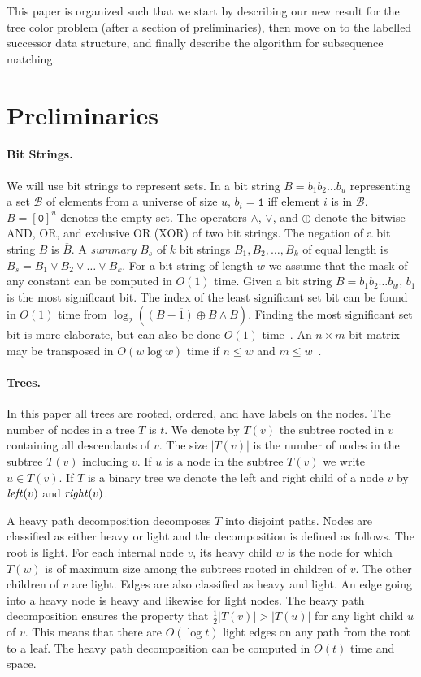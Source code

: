 \documentclass[11pt]{article}
\newcommand{\tree}{\ensuremath{T}}
\newcommand{\leftc}{\ensuremath{\text{\textit{left}}}}
\newcommand{\rightc}{\ensuremath{\text{\textit{right}}}}
\newcommand{\band}{\ensuremath{\wedge}}
\newcommand{\bor}{\ensuremath{\vee}}
\newcommand{\bxor}{\ensuremath{\oplus}}
\begin{document}
This paper is organized such that we start by describing our new result for the tree color problem (after a section of preliminaries), then move on to the labelled successor data structure, and finally describe the algorithm for subsequence matching.

\section{Preliminaries}



\paragraph{Bit Strings.}
We will use bit strings to represent sets. In a bit string $B=b_1b_2\ldots b_u$ representing a set $\mathcal{B}$ of elements from a universe of size $u$, $b_i=\mathtt{1}$ iff element $i$ is in $\mathcal{B}$. $B=[\mathtt{0}]^u$ denotes the empty set. The operators $\band$, $\bor$, and $\bxor$ denote the bitwise AND, OR, and exclusive OR (XOR) of two bit strings. The negation of a bit string $B$ is $\overline{B}$. A \emph{summary} $B_s$ of $k$ bit strings $B_1,B_2, \ldots,B_k$ of equal length is $B_s=B_1 \bor B_2 \bor \ldots \bor B_k$. For a bit string of length $w$ we assume that the mask of any constant can be computed in $O(1)$ time. Given a bit string $B=b_1b_2\ldots b_w$, $b_1$ is the most significant bit. The index of the least significant set bit can be found in $O(1)$ time from $\log_2 ( \overline{(B-1)\bxor B}\band B )$. Finding the most significant set bit is more elaborate, but can also be done $O(1)$ time~\cite{fredman1993surpassing}. An $n\times m$ bit matrix may be transposed in $O(w\log w)$ time if $n\leq w$ and $m\leq w$~\cite{thorup2002randomized}.

\paragraph{Trees.}
In this paper all trees are rooted, ordered, and have labels on the nodes. The number of nodes in a tree $\tree$ is $t$. We denote by $\tree(v)$ the subtree rooted in $v$ containing all descendants of $v$. The size $|\tree(v)|$ is the number of nodes in the subtree $\tree(v)$ including $v$. If $u$ is a node in the subtree $\tree(v)$ we write $u\in \tree(v)$. If $\tree$ is a binary tree we denote the left and right child of a node $v$ by $\leftc(v)$ and $\rightc(v)$. 

A heavy path decomposition \cite{sleator1983data} decomposes $\tree$ into disjoint paths. Nodes are classified as either heavy or light and the decomposition is defined as follows. The root is light. For each internal node $v$, its heavy child $w$ is the node for which $\tree(w)$ is of maximum size among the subtrees rooted in children of $v$. The other children of $v$ are light. Edges are also classified as heavy and light. An edge going into a heavy node is heavy and likewise for light nodes. The heavy path decomposition ensures the property that $\frac{1}{2}|\tree(v)|>|\tree(u)|$ for any light child $u$ of $v$. This means that there are $O(\log t)$ light edges on any path from the root to a leaf. The heavy path decomposition can be computed in $O(t)$ time and space.
\end{document}
